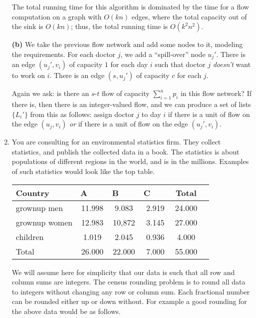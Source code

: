 \documentclass[12pt]{article}
\begin{document}
\begin{enumerate}
{The total running time for this algorithm is dominated
by the time for a flow computation on a graph with $O(kn)$ edges,
where the total capacity out of the sink is $O(kn)$;
thus, the total running time is $O(k^2 n^2)$.

{\bf (b)} We take the previous flow network and
add some nodes to it, modeling the requirements.
For each doctor $j$, we add a ``spill-over'' node $u_j'$.
There is an edge $(u_j', v_i)$ of capacity $1$
for each day $i$ such that doctor $j$ {\em doesn't}
want to work on $i$.
There is an edge $(s,u_j')$ of capacity $c$ for each $j$.

Again we ask: is there an $s$-$t$ flow of capacity $\sum_{i=1}^n p_i$
in this flow network?
If there is, then there is an integer-valued flow,
and we can produce a set of lists $\{L_i'\}$ from this
as follows: assign doctor $j$ to day $i$ if there
is a unit of flow on the edge $(u_j,v_i)$
{\em or} if there is a unit of flow on the edge $(u_j',v_i)$.

}


\item

You are consulting for an environmental statistics firm. They
collect statistics, and publish the collected data in a book. The statistics
is about populations of different regions in the world, and is in the millions.
Examples of such statistics would look like the top table.

\begin{table}[h]
\begin{center}
\begin{tabular}{|l||c|c|c|c||c|}
\hline Country & A ~~~ & B ~~~  & C ~~~ & Total \\  \hline
grownup men  &  11.998 & 9.083 & 2.919& 24.000\\
grownup women &  12.983 & 10,872 & 3.145 & 27.000  \\  \hline
children &  1.019 &   2.045& 0.936& 4.000  \\ \hline \hline
Total &  26.000 & 22.000 & 7.000 & 55.000  \\ \hline
\end{tabular}
\end{center}
\end{table}

We will assume here for simplicity that our data is such that all
row and column sums are integers. The census rounding problem is to
round all data to integers without changing any row or column sum.
Each fractional number can be rounded either up or down without.
For example a good rounding for the above data would be as follows.


\end{enumerate}
\end{document}
